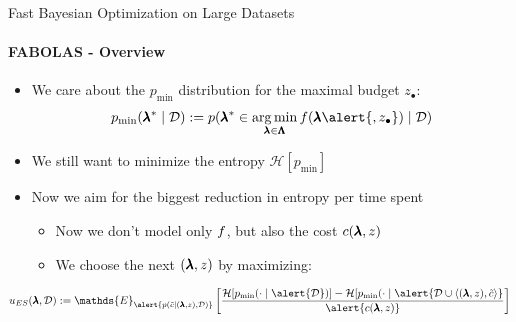 \begin{frame}[c]{Fast Bayesian Optimization on Large Datasets}
\framesubtitle{FABOLAS - Overview}
\begin{itemize}
		\item We care about the $p_{\text{min}}$ distribution for the maximal budget $z_{\bullet}$:
		$$p_{\text{min}}(\conf^* \mid \dataset) := p(\conf^* \in \argmin_{\conf\in \pcs} \func(\conf\alert{,z_{\bullet}}) \mid \dataset)$$
	
		\item We still want to minimize the entropy $\mathcal{H}[p_\text{min}]$
\pause
		\item Now we aim for the biggest \alert{reduction in entropy per time spent}
		\begin{itemize}
			\item Now we don't model only $f$, but also \alert{the cost $c(\pmb{\lambda},z)$}
			\item We choose the next $(\pmb{\lambda},z)$ by maximizing:
		\end{itemize}
\end{itemize}
\vspace*{0.5cm}
	\[{\acq}_{ES}(\conf,\dataset) := \mathds{E}_{\alert{p(\tilde{\cost}\mid (\conf, z), \dataset)}} 
	\left[   \frac{\mathcal{H}[p_{\text{min}}(\cdot \mid \alert{\dataset})] - \mathcal{H}[p_{\text{min}}(\cdot \mid \alert{\dataset \cup \left\langle (\conf,z), \tilde{\cost} \right\rangle}}{\alert{c(\conf,z)}} \right]\]

\end{frame}

